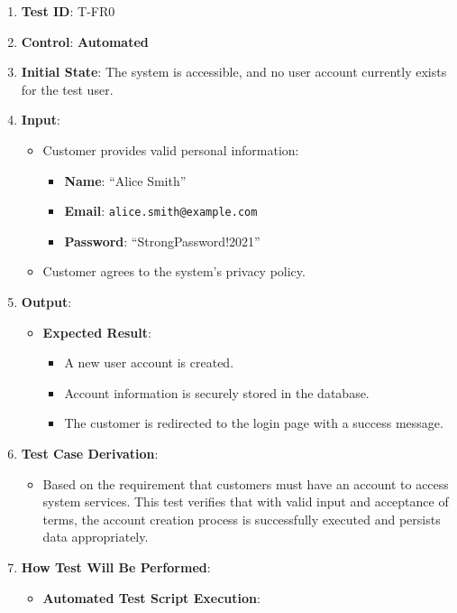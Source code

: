 \documentclass[12pt, titlepage]{article}
\begin{document}
\begin{enumerate}
    \item \textbf{Test ID}: T-FR0
    \item \textbf{Control}: \textbf{Automated}
    \item \textbf{Initial State}: The system is accessible, and no user account currently exists for the test user.
    \item \textbf{Input}:
    \begin{itemize}
        \item Customer provides valid personal information:
        \begin{itemize}
            \item \textbf{Name}: ``Alice Smith''
            \item \textbf{Email}: \texttt{alice.smith@example.com}
            \item \textbf{Password}: ``StrongPassword!2021''
        \end{itemize}
        \item Customer agrees to the system's privacy policy.
    \end{itemize}
    \item \textbf{Output}:
    \begin{itemize}
        \item \textbf{Expected Result}:
        \begin{itemize}
            \item A new user account is created.
            \item Account information is securely stored in the database.
            \item The customer is redirected to the login page with a success message.
        \end{itemize}
    \end{itemize}
    \item \textbf{Test Case Derivation}:
    \begin{itemize}
        \item Based on the requirement that customers must have an account to access system services. This test verifies that with valid input and acceptance of terms, the account creation process is successfully executed and persists data appropriately.
    \end{itemize}
    \item \textbf{How Test Will Be Performed}:
    \begin{itemize}
        \item \textbf{Automated Test Script Execution}:

\end{itemize}
\end{enumerate}
\end{document}
